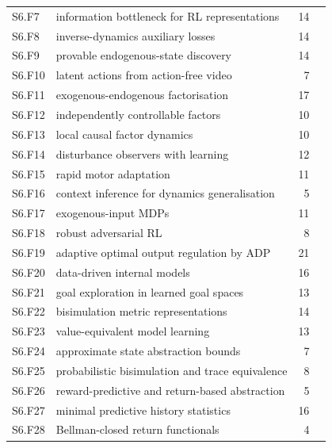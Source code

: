 \documentclass[10pt]{article}
\begin{document}
{\begin{longtable}{@{}p{1.3cm}p{8.6cm}rp{4.4cm}@{}}
S6.F7 & information bottleneck for RL representations & 14 & \citet{Achille-emergence17}\\
S6.F8 & inverse-dynamics auxiliary losses & 14 & \citet{Ivashkov-smwm26}\\
S6.F9 & provable endogenous-state discovery & 14 & \citet{Lamb-guaranteed23}\\
S6.F10 & latent actions from action-free video & 7 & \citet{Baker-video22}\\
S6.F11 & exogenous-endogenous factorisation & 17 & \citet{Dietterich-discovering18}\\
S6.F12 & independently controllable factors & 10 & \citet{Kooi-disentangled23}\\
S6.F13 & local causal factor dynamics & 10 & \citet{Pitis-counterfactual20}\\
S6.F14 & disturbance observers with learning & 12 & \citet{Han-pid09}\\
S6.F15 & rapid motor adaptation & 11 & \citet{Kumar-rma21}\\
S6.F16 & context inference for dynamics generalisation & 5 & \citet{Evans-context22}\\
S6.F17 & exogenous-input MDPs & 11 & \citet{Mao-variance18}\\
S6.F18 & robust adversarial RL & 8 & \citet{Morimoto-robust05}\\
S6.F19 & adaptive optimal output regulation by ADP & 21 & \citet{Qasem-adaptive22}\\
S6.F20 & data-driven internal models & 16 & \citet{Nikiforov-adaptive98}\\
S6.F21 & goal exploration in learned goal spaces & 13 & \citet{Forestier-intrinsically17}\\
S6.F22 & bisimulation metric representations & 14 & \citet{Ferns-metrics04}\\
S6.F23 & value-equivalent model learning & 13 & \citet{Schrittwieser-mastering19}\\
S6.F24 & approximate state abstraction bounds & 7 & \citet{Li-towards06}\\
S6.F25 & probabilistic bisimulation and trace equivalence & 8 & \citet{Castro-equivalence09}\\
S6.F26 & reward-predictive and return-based abstraction & 5 & \citet{Liu-returnbased21}\\
S6.F27 & minimal predictive history statistics & 16 & \citet{Barnett-computational15}\\
S6.F28 & Bellman-closed return functionals & 4 & \citet{AvilaPires-optimizing25}\\

\end{longtable}}
\end{document}
